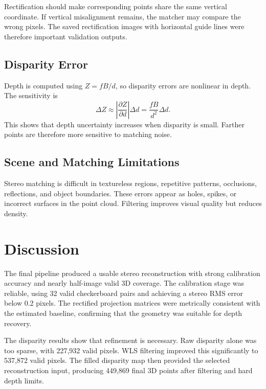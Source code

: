 \documentclass[11pt,a4paper]{article}
\begin{document}
Rectification should make corresponding points share the same vertical coordinate. If vertical misalignment remains, the matcher may compare the wrong pixels. The saved rectification images with horizontal guide lines were therefore important validation outputs.

\subsection{Disparity Error}

Depth is computed using \(Z=fB/d\), so disparity errors are nonlinear in depth. The sensitivity is
\begin{equation}
    \Delta Z \approx \left|\frac{\partial Z}{\partial d}\right|\Delta d
    = \frac{fB}{d^2}\Delta d.
\end{equation}
This shows that depth uncertainty increases when disparity is small. Farther points are therefore more sensitive to matching noise.

\subsection{Scene and Matching Limitations}

Stereo matching is difficult in textureless regions, repetitive patterns, occlusions, reflections, and object boundaries. These errors appear as holes, spikes, or incorrect surfaces in the point cloud. Filtering improves visual quality but reduces density.

\section{Discussion}

The final pipeline produced a usable stereo reconstruction with strong calibration accuracy and nearly half-image valid 3D coverage. The calibration stage was reliable, using 32 valid checkerboard pairs and achieving a stereo RMS error below 0.2 pixels. The rectified projection matrices were metrically consistent with the estimated baseline, confirming that the geometry was suitable for depth recovery.

The disparity results show that refinement is necessary. Raw disparity alone was too sparse, with 227,932 valid pixels. WLS filtering improved this significantly to 537,872 valid pixels. The filled disparity map then provided the selected reconstruction input, producing 449,869 final 3D points after filtering and hard depth limits.
\end{document}
